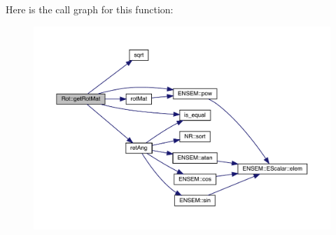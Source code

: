 Here is the call graph for this function\+:\nopagebreak
\begin{figure}[H]
\begin{center}
\leavevmode
\includegraphics[width=350pt]{d7/dcc/namespaceRot_a4026d82f0e6d2b013f7b082ff3d509aa_cgraph}
\end{center}
\end{figure}
